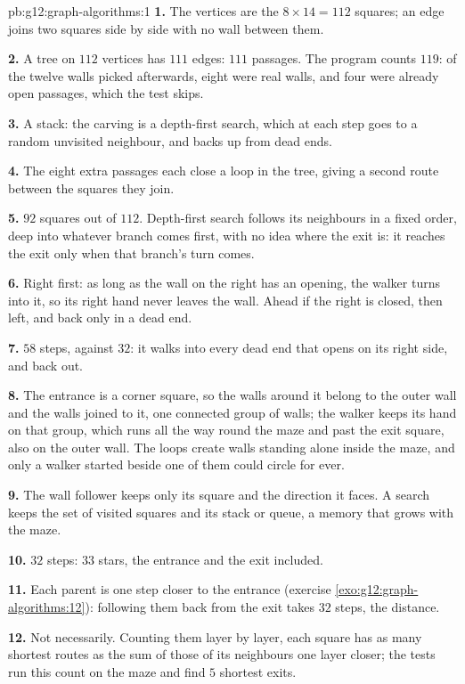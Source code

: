 \begin{solution}{pb:g12:graph-algorithms:1}
\textbf{1.} The vertices are the $8 \times 14 = 112$ squares; an edge joins two squares side by side with no wall
between them.

\textbf{2.} A tree on $112$ vertices has $111$ edges: $111$ passages. The program counts $119$: of the twelve walls
picked afterwards, eight were real walls, and four were already open passages, which the test 
skips.

\textbf{3.} A stack: the carving is a depth-first search, which at each step goes to a random unvisited neighbour, and
backs up from dead ends.

\textbf{4.} The eight extra passages each close a loop in the tree, giving a second route between the squares they
join.

\textbf{5.} $92$ squares out of $112$. Depth-first search follows its neighbours in a fixed order, deep into whatever
branch comes first, with no idea where the exit is: it reaches the exit only when that branch's turn comes.

\textbf{6.} Right first: as long as the wall on the right has an opening, the walker turns into it, so its right hand
never leaves the wall. Ahead if the right is closed, then left, and back only in a dead end.

\textbf{7.} $58$ steps, against $32$: it walks into every dead end that opens on its right side, and back out.

\textbf{8.} The entrance is a corner square, so the walls around it belong to the outer wall and the walls joined to
it, one connected group of walls; the walker keeps its hand on that group, which runs all the way round the maze
and past the exit square, also on the outer wall. The loops create walls standing alone inside the maze, and only a
walker started beside one of them could circle for ever.

\textbf{9.} The wall follower keeps only its square and the direction it faces. A search keeps the set of visited
squares and its stack or queue, a memory that grows with the maze.

\textbf{10.} $32$ steps: $33$ stars, the entrance and the exit included.

\textbf{11.} Each parent is one step closer to the entrance (exercise \ref{exo:g12:graph-algorithms:12}): following
them back from the exit takes $32$ steps, the distance.

\textbf{12.} Not necessarily. Counting them layer by layer, each square has as many shortest routes as the sum of
those of its neighbours one layer closer; the tests run this count on the maze and find $5$ shortest exits.


\end{solution}
